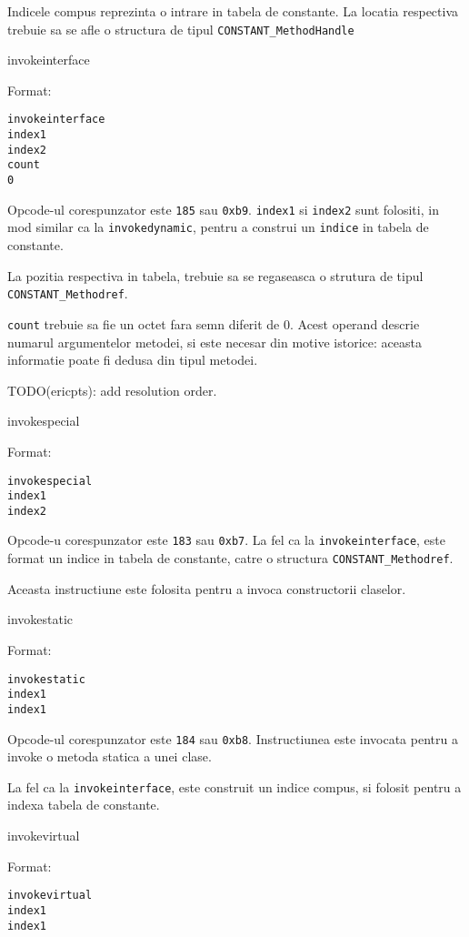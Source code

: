 \documentclass[]{article}
\begin{document}
Indicele compus reprezinta o intrare in tabela de constante. La locatia
respectiva trebuie sa se afle o structura de tipul
\texttt{CONSTANT\_MethodHandle}

invokeinterface

Format:

\begin{verbatim}
invokeinterface
index1
index2
count
0
\end{verbatim}

Opcode-ul corespunzator este \texttt{185} sau \texttt{0xb9}.
\texttt{index1} si \texttt{index2} sunt folositi, in mod similar ca la
\texttt{invokedynamic}, pentru a construi un \texttt{indice} in tabela
de constante.

La pozitia respectiva in tabela, trebuie sa se regaseasca o strutura de
tipul \texttt{CONSTANT\_Methodref}.

\texttt{count} trebuie sa fie un octet fara semn diferit de 0. Acest
operand descrie numarul argumentelor metodei, si este necesar din motive
istorice: aceasta informatie poate fi dedusa din tipul metodei.

TODO(ericpts): add resolution order.

invokespecial

Format:

\begin{verbatim}
invokespecial
index1
index2
\end{verbatim}

Opcode-u corespunzator este \texttt{183} sau \texttt{0xb7}. La fel ca la
\texttt{invokeinterface}, este format un indice in tabela de constante,
catre o structura \texttt{CONSTANT\_Methodref}.

Aceasta instructiune este folosita pentru a invoca constructorii
claselor.

invokestatic

Format:

\begin{verbatim}
invokestatic
index1
index1
\end{verbatim}

Opcode-ul corespunzator este \texttt{184} sau \texttt{0xb8}.
Instructiunea este invocata pentru a invoke o metoda statica a unei
clase.

La fel ca la \texttt{invokeinterface}, este construit un indice compus,
si folosit pentru a indexa tabela de constante.

invokevirtual

Format:

\begin{verbatim}
invokevirtual
index1
index1
\end{verbatim}
\end{document}
